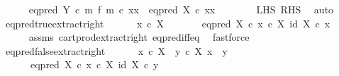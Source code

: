 \begin{isabellebody}
\ \ \ \ \isamarkupfalse%
\ {\isachardoublequoteopen}{\isacharparenleft}{\kern0pt}eq{\isacharunderscore}{\kern0pt}pred\ Y\ {\isasymcirc}\isactrlsub c\ m\ {\isasymtimes}\isactrlsub f\ m{\isacharparenright}{\kern0pt}\ {\isasymcirc}\isactrlsub c\ {\isasymlangle}x{}{\isacharcomma}{\kern0pt}x{}{\isasymrangle}\ {\isacharequal}{\kern0pt}\ eq{\isacharunderscore}{\kern0pt}pred\ X\ {\isasymcirc}\isactrlsub c\ {\isasymlangle}x{}{\isacharcomma}{\kern0pt}x{}{\isasymrangle}{\isachardoublequoteclose}\isanewline
\ \ \ \ \ \ \isamarkupfalse%
\ LHS\ RHS\ \isamarkupfalse%
\ auto\isanewline
\ \ \isamarkupfalse%
\isanewline
{}\isamarkupfalse%
%
\endisatagproof
{\isafoldproof}%
%
\isadelimproof
\isanewline
%
\endisadelimproof
\isanewline
{}\isamarkupfalse%
\ eq{\isacharunderscore}{\kern0pt}pred{\isacharunderscore}{\kern0pt}true{\isacharunderscore}{\kern0pt}extract{\isacharunderscore}{\kern0pt}right{\isacharcolon}{\kern0pt}\ \isanewline
\ \ \ \ \ {\isachardoublequoteopen}x\ {\isasymin}\isactrlsub c\ X{\isachardoublequoteclose}\ \isanewline
\ \ \ \ \ \ {\isachardoublequoteopen}eq{\isacharunderscore}{\kern0pt}pred\ X\ {\isasymcirc}\isactrlsub c\ {\isasymlangle}x\ {\isasymcirc}\isactrlsub c\ {\isasymbeta}\isactrlbsub X\isactrlesub {\isacharcomma}{\kern0pt}\ id\ X{\isasymrangle}\ {\isasymcirc}\isactrlsub c\ x\ {\isacharequal}{\kern0pt}\ {\isasymt}{\isachardoublequoteclose}\isanewline
%
\isadelimproof
\ \ \ \ %
\endisadelimproof
%
\isatagproof
{}\isamarkupfalse%
\ assms\ cart{\isacharunderscore}{\kern0pt}prod{\isacharunderscore}{\kern0pt}extract{\isacharunderscore}{\kern0pt}right\ eq{\isacharunderscore}{\kern0pt}pred{\isacharunderscore}{\kern0pt}iff{\isacharunderscore}{\kern0pt}eq\ \isamarkupfalse%
\ fastforce%
\endisatagproof
{\isafoldproof}%
%
\isadelimproof
\isanewline
%
\endisadelimproof
\isanewline
{}\isamarkupfalse%
\ eq{\isacharunderscore}{\kern0pt}pred{\isacharunderscore}{\kern0pt}false{\isacharunderscore}{\kern0pt}extract{\isacharunderscore}{\kern0pt}right{\isacharcolon}{\kern0pt}\ \isanewline
\ \ \ \ \ {\isachardoublequoteopen}x\ {\isasymin}\isactrlsub c\ X{\isachardoublequoteclose}\ \ {\isachardoublequoteopen}y\ {\isasymin}\isactrlsub c\ X{\isachardoublequoteclose}\ {\isachardoublequoteopen}x\ {\isasymnoteq}\ y{\isachardoublequoteclose}\isanewline
\ \ \ \ \ \ {\isachardoublequoteopen}eq{\isacharunderscore}{\kern0pt}pred\ X\ {\isasymcirc}\isactrlsub c\ {\isasymlangle}x\ {\isasymcirc}\isactrlsub c\ {\isasymbeta}\isactrlbsub X\isactrlesub {\isacharcomma}{\kern0pt}\ id\ X{\isasymrangle}\ {\isasymcirc}\isactrlsub c\ y\ {\isacharequal}{\kern0pt}\ {\isasymf}{\isachardoublequoteclose}\isanewline

\end{isabellebody}
